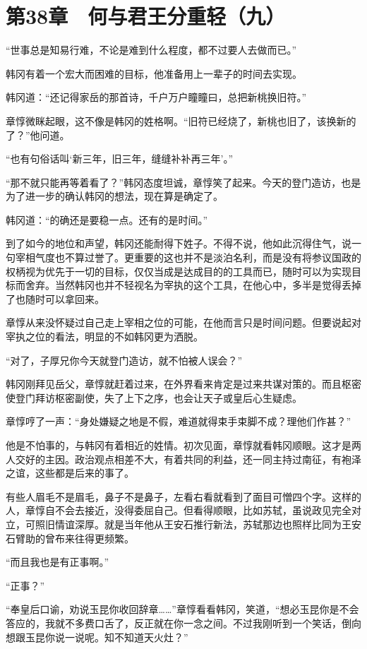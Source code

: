 \section{第38章　何与君王分重轻（九）}

“世事总是知易行难，不论是难到什么程度，都不过要人去做而已。”

韩冈有着一个宏大而困难的目标，他准备用上一辈子的时间去实现。

韩冈道：“还记得家岳的那首诗，千户万户瞳瞳曰，总把新桃换旧符。”

章惇微眯起眼，这不像是韩冈的姓格啊。“旧符已经烧了，新桃也旧了，该换新的了？”他问道。

“也有句俗话叫‘新三年，旧三年，缝缝补补再三年’。”

“那不就只能再等着看了？”韩冈态度坦诚，章惇笑了起来。今天的登门造访，也是为了进一步的确认韩冈的想法，现在算是确定了。

韩冈道：“的确还是要稳一点。还有的是时间。”

到了如今的地位和声望，韩冈还能耐得下姓子。不得不说，他如此沉得住气，说一句宰相气度也不算过誉了。更重要的这也并不是淡泊名利，而是没有将参议国政的权柄视为优先于一切的目标，仅仅当成是达成目的的工具而已，随时可以为实现目标而舍弃。当然韩冈也并不轻视名为宰执的这个工具，在他心中，多半是觉得丢掉了也随时可以拿回来。

章惇从来没怀疑过自己走上宰相之位的可能，在他而言只是时间问题。但要说起对宰执之位的看法，明显的不如韩冈更为洒脱。

“对了，子厚兄你今天就登门造访，就不怕被人误会？”

韩冈刚拜见岳父，章惇就赶着过来，在外界看来肯定是过来共谋对策的。而且枢密使登门拜访枢密副使，失了上下之序，也会让天子或皇后心生疑虑。

章惇哼了一声：“身处嫌疑之地是不假，难道就得束手束脚不成？理他们作甚？”

他是不怕事的，与韩冈有着相近的姓情。初次见面，章惇就看韩冈顺眼。这才是两人交好的主因。政治观点相差不大，有着共同的利益，还一同主持过南征，有袍泽之谊，这些都是后来的事了。

有些人眉毛不是眉毛，鼻子不是鼻子，左看右看就看到了面目可憎四个字。这样的人，章惇自不会去接近，没得委屈自己。但看得顺眼，比如苏轼，虽说政见完全对立，可照旧情谊深厚。就是当年他从王安石推行新法，苏轼那边也照样比同为王安石臂助的曾布来往得更频繁。

“而且我也是有正事啊。”

“正事？”

“奉皇后口谕，劝说玉昆你收回辞章……”章惇看看韩冈，笑道，“想必玉昆你是不会答应的，我就不多费口舌了，反正就在你一念之间。不过我刚听到一个笑话，倒向想跟玉昆你说一说呢。知不知道天火灶？”

